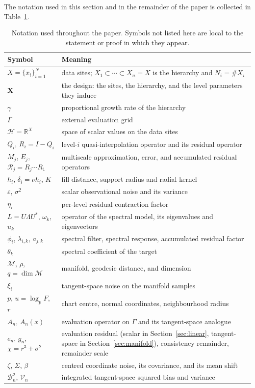 \documentclass[12pt]{article}
\newcommand{\R}{\mathbb{R}}
\newcommand{\M}{\mathcal{M}}
\begin{document}
The notation used in this section and in the remainder of the paper is collected in Table~\ref{tab:notation}.
\begin{table}[!ht]
\centering\small
\begin{tabular}{@{}lp{}@{}}
\toprule
Symbol & Meaning \\
\midrule
$X=\{x_i\}_{i=1}^N$ & data sites; $X_1\subset\cdots\subset X_n=X$ is the hierarchy and $N_i=\#X_i$ \\
$\mathbf X$ & the design: the sites, the hierarchy, and the level parameters they induce \\
$\gamma$ & proportional growth rate of the hierarchy \\
$\Gamma$ & external evaluation grid \\
$\mathcal H=\R^{X}$ & space of scalar values on the data sites \\
$Q_i$, $R_i=I-Q_i$ & level-$i$ quasi-interpolation operator and its residual operator \\
$M_j$, $E_j$, $\mathcal R_j=R_j\cdots R_1$ & multiscale approximation, error, and accumulated residual operators \\
$h_i$, $\delta_i=\nu h_i$, $K$ & fill distance, support radius and radial kernel \\
$\varepsilon$, $\sigma^2$ & scalar observational noise and its variance \\
$\eta_i$ & per-level residual contraction factor \\
$L=U\Lambda U^{*}$, $\omega_k$, $u_k$ & operator of the spectral model, its eigenvalues and eigenvectors \\
$\phi_i$, $\lambda_{i,k}$, $a_{j,k}$ & spectral filter, spectral response, accumulated residual factor \\
$\theta_k$ & spectral coefficient of the target \\
$\M$, $\rho$, $q=\dim\M$ & manifold, geodesic distance, and dimension \\
$\xi_i$ & tangent-space noise on the manifold samples \\
$p$, $u=\log_pF$, $r$ & chart centre, normal coordinates, neighbourhood radius \\
$A_n$, $A_n(x)$ & evaluation operator on $\Gamma$ and its tangent-space analogue \\
$e_n$, $g_n$, $\chi=r^3+\sigma^2$ & evaluation residual (scalar in Section~\ref{sec:linear}, tangent-space in Section~\ref{sec:manifold}), consistency remainder, remainder scale \\
$\zeta$, $\Sigma$, $\beta$ & centred coordinate noise, its covariance, and its mean shift \\
$\mathcal B_n^2$, $\mathcal V_n$ & integrated tangent-space squared bias and variance \\
\bottomrule
\end{tabular}
\caption{Notation used throughout the paper. Symbols not listed here are local to the statement or proof in which they appear.}
\label{tab:notation}
\end{table}
\end{document}
